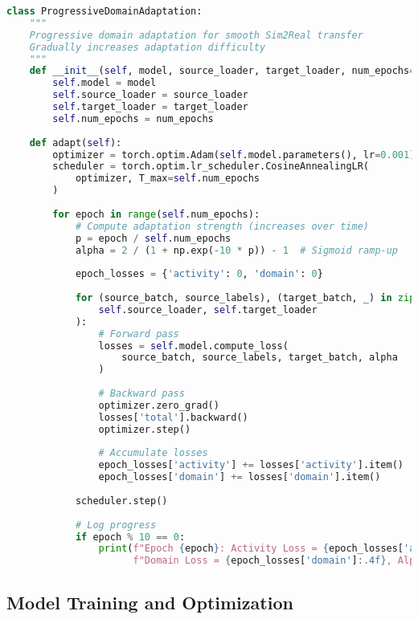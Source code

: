 \documentclass[journal]{IEEEtran}
\begin{document}
\begin{lstlisting}[language=Python, caption=Progressive Domain Adaptation Strategy]
class ProgressiveDomainAdaptation:
    """
    Progressive domain adaptation for smooth Sim2Real transfer
    Gradually increases adaptation difficulty
    """
    def __init__(self, model, source_loader, target_loader, num_epochs=100):
        self.model = model
        self.source_loader = source_loader
        self.target_loader = target_loader
        self.num_epochs = num_epochs
        
    def adapt(self):
        optimizer = torch.optim.Adam(self.model.parameters(), lr=0.001)
        scheduler = torch.optim.lr_scheduler.CosineAnnealingLR(
            optimizer, T_max=self.num_epochs
        )
        
        for epoch in range(self.num_epochs):
            # Compute adaptation strength (increases over time)
            p = epoch / self.num_epochs
            alpha = 2 / (1 + np.exp(-10 * p)) - 1  # Sigmoid ramp-up
            
            epoch_losses = {'activity': 0, 'domain': 0}
            
            for (source_batch, source_labels), (target_batch, _) in zip(
                self.source_loader, self.target_loader
            ):
                # Forward pass
                losses = self.model.compute_loss(
                    source_batch, source_labels, target_batch, alpha
                )
                
                # Backward pass
                optimizer.zero_grad()
                losses['total'].backward()
                optimizer.step()
                
                # Accumulate losses
                epoch_losses['activity'] += losses['activity'].item()
                epoch_losses['domain'] += losses['domain'].item()
            
            scheduler.step()
            
            # Log progress
            if epoch % 10 == 0:
                print(f"Epoch {epoch}: Activity Loss = {epoch_losses['activity']:.4f}, "
                      f"Domain Loss = {epoch_losses['domain']:.4f}, Alpha = {alpha:.3f}")
\end{lstlisting}

\subsection{Model Training and Optimization}
\end{document}
